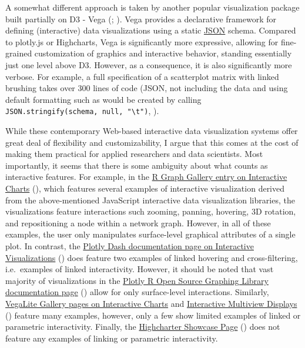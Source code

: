 \documentclass[
]{book}
\theoremstyle{definition}
\theoremstyle{definition}
\theoremstyle{definition}
\theoremstyle{definition}
\theoremstyle{remark}
\begin{document}
A somewhat different approach is taken by another popular visualization package built partially on D3 - Vega (; ). Vega provides a declarative framework for defining (interactive) data visualizations using a static \hyperref[JSON]{JSON} schema. Compared to plotly.js or Highcharts, Vega is significantly more expressive, allowing for fine-grained customization of graphics and interactive behavior, standing essentially just one level above D3. However, as a consequence, it is also significantly more verbose. For example, a full specification of a scatterplot matrix with linked brushing takes over 300 lines of code (JSON, not including the data and using default formatting such as would be created by calling \texttt{JSON.stringify(schema,\ null,\ "\textbackslash{}t")}, ).

While these contemporary Web-based interactive data visualization systems offer great deal of flexibility and customizability, I argue that this comes at the cost of making them practical for applied researchers and data scientists. Most importantly, it seems that there is some ambiguity about what counts as interactive features. For example, in the \href{https://r-graph-gallery.com/interactive-charts.html}{R Graph Gallery entry on Interactive Charts} (), which features several examples of interactive visualization derived from the above-mentioned JavaScript interactive data visualization libraries, the visualizations feature interactions such zooming, panning, hovering, 3D rotation, and repositioning a node within a network graph. However, in all of these examples, the user only manipulates surface-level graphical attributes of a single plot. In contrast, the \href{https://dash.plotly.com/interactive-graphing}{Plotly Dash documentation page on Interactive Visualizations} () does feature two examples of linked hovering and cross-filtering, i.e.~examples of linked interactivity. However, it should be noted that vast majority of visualizations in the \href{https://plotly.com/r/}{Plotly R Open Source Graphing Library documentation page} () allow for only surface-level interactions. Similarly, \href{https://vega.github.io/vega-lite/examples/\#interactive-charts}{VegaLite Gallery pages on Interactive Charts} and \href{https://vega.github.io/vega-lite/examples/\#interactive-multi-view-displays}{Interactive Multiview Displays} () feature many examples, however, only a few show limited examples of linked or parametric interactivity. Finally, the \href{https://jkunst.com/highcharter/articles/showcase.html}{Highcharter Showcase Page} () does not feature any examples of linking or parametric interactivity.
\end{document}
